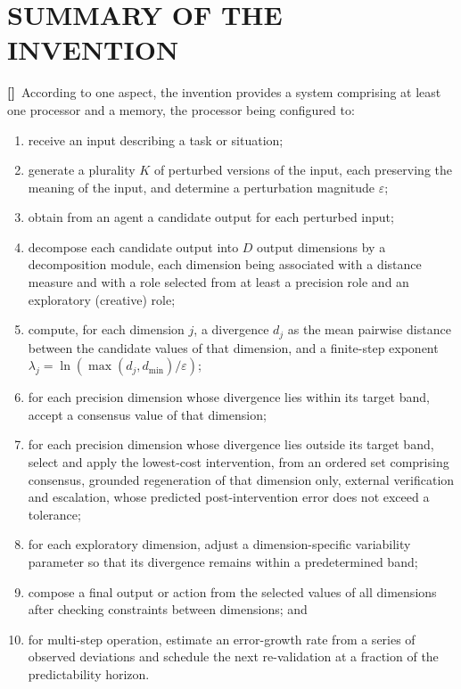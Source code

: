 \documentclass[12pt,a4paper]{article}
\newcounter{para}
\newcommand{\p}{\refstepcounter{para}\textbf{[\thepara]}\ }
\begin{document}
\section*{SUMMARY OF THE INVENTION}

\p According to one aspect, the invention provides a system comprising at least one processor and a memory, the processor being configured to:
\begin{enumerate}[label=(\roman*)]
\item receive an input describing a task or situation;
\item generate a plurality $K$ of perturbed versions of the input, each preserving the meaning of the input, and determine a perturbation magnitude $\varepsilon$;
\item obtain from an agent a candidate output for each perturbed input;
\item decompose each candidate output into $D$ output dimensions by a decomposition module, each dimension being associated with a distance measure and with a role selected from at least a precision role and an exploratory (creative) role;
\item compute, for each dimension $j$, a divergence $d_j$ as the mean pairwise distance between the candidate values of that dimension, and a finite-step exponent $\lambda_j=\ln(\max(d_j,d_{\min})/\varepsilon)$;
\item for each precision dimension whose divergence lies within its target band, accept a consensus value of that dimension;
\item for each precision dimension whose divergence lies outside its target band, select and apply the lowest-cost intervention, from an ordered set comprising consensus, grounded regeneration of that dimension only, external verification and escalation, whose predicted post-intervention error does not exceed a tolerance;
\item for each exploratory dimension, adjust a dimension-specific variability parameter so that its divergence remains within a predetermined band;
\item compose a final output or action from the selected values of all dimensions after checking constraints between dimensions; and
\item for multi-step operation, estimate an error-growth rate from a series of observed deviations and schedule the next re-validation at a fraction of the predictability horizon.
\end{enumerate}
\end{document}
